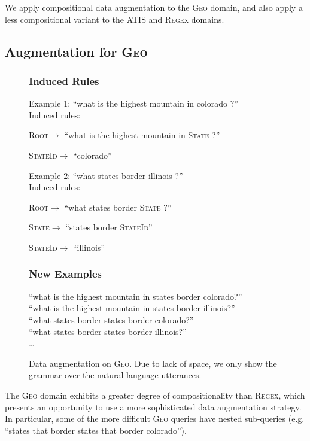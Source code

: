 \documentclass[11pt,letterpaper]{article}
\newcommand{\atis}{\textsc{ATIS}\xspace}
\newcommand{\regex}{\textsc{Regex}\xspace}
\newcommand{\geo}{\textsc{Geo}\xspace}
\newcommand{\catroot}{\textsc{Root}\xspace}
\newcommand{\catstate}{\textsc{State}\xspace}
\newcommand{\catstateid}{\textsc{StateId}\xspace}
\begin{document}
We apply compositional data augmentation to the \geo domain,
and also apply a less compositional variant to the
\atis and \regex domains.

\subsection{Augmentation for \geo}
\begin{figure}[t] 
\small
\begin{framed}
\footnotesize
\subsubsection*{Induced Rules}
Example 1: ``what is the highest mountain in colorado ?''\\
Induced rules:

\quad \catroot $\to$ ``what is the highest mountain in \catstate { }?''

\quad \catstateid $\to$ ``colorado''

Example 2: ``what states border illinois ?''\\
Induced rules:

\quad \catroot $\to$ ``what states border \catstate { }?''

\quad \catstate $\to$ ``states border \catstateid''

\quad \catstateid $\to$ ``illinois''

\subsubsection*{New Examples} 
``what is the highest mountain in states border colorado?'' \\
``what is the highest mountain in states border illinois?'' \\
``what states border states border colorado?'' \\
``what states border states border illinois?'' \\
\dots
\end{framed}
\caption{Data augmentation on \geo.  Due to lack of space,
we only show the grammar over the natural language utterances.}
\label{fig:augment-geo}
\end{figure}
The \geo domain exhibits a greater degree of compositionality
than \regex, which presents an opportunity to use a more sophisticated
data augmentation strategy.
In particular, some of the more difficult \geo queries have
nested sub-queries (e.g. ``states that border states that border colorado'').
\end{document}
